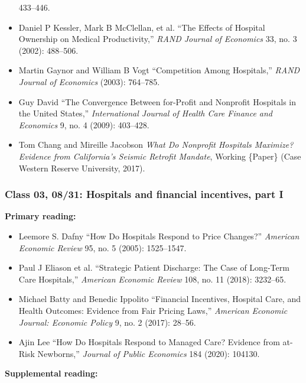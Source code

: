 \documentclass[11pt,]{article}
\providecommand{\tightlist}{%
  \setlength{\itemsep}{0pt}\setlength{\parskip}{0pt}}
\begin{document}
\begin{itemize}
  433--446.
\item
  Daniel P Kessler, Mark B McClellan, et al. {``The {Effects} of
  {Hospital} {Ownership} on {Medical} {Productivity},''} \emph{RAND
  Journal of Economics} 33, no. 3 (2002): 488--506.
\item
  Martin Gaynor and William B Vogt {``Competition Among {Hospitals},''}
  \emph{RAND Journal of Economics} (2003): 764--785.
\item
  Guy David {``The Convergence Between for-Profit and Nonprofit
  Hospitals in the {United} {States},''} \emph{International Journal of
  Health Care Finance and Economics} 9, no. 4 (2009): 403--428.
\item
  Tom Chang and Mireille Jacobson \emph{What Do {Nonprofit} {Hospitals}
  {Maximize}? {Evidence} from {California}'s {Seismic} {Retrofit}
  {Mandate}}, Working \{Paper\} (Case Western Reserve University, 2017).
\end{itemize}

\hypertarget{class-03-0831-hospitals-and-financial-incentives-part-i}{%
\subsubsection{Class 03, 08/31: Hospitals and financial incentives, part
I}\label{class-03-0831-hospitals-and-financial-incentives-part-i}}

\textbf{Primary reading:}

\begin{itemize}
\tightlist
\item
  Leemore S. Dafny {``How {Do} {Hospitals} {Respond} to {Price}
  {Changes}?''} \emph{American Economic Review} 95, no. 5 (2005):
  1525--1547.
\item
  Paul J Eliason et al. {``Strategic Patient Discharge: {The} Case of
  Long-Term Care Hospitals,''} \emph{American Economic Review} 108, no.
  11 (2018): 3232--65.
\item
  Michael Batty and Benedic Ippolito {``Financial Incentives, Hospital
  Care, and Health Outcomes: {Evidence} from Fair Pricing Laws,''}
  \emph{American Economic Journal: Economic Policy} 9, no. 2 (2017):
  28--56.
\item
  Ajin Lee {``How Do Hospitals Respond to Managed Care? {Evidence} from
  at-Risk Newborns,''} \emph{Journal of Public Economics} 184 (2020):
  104130.
\end{itemize}

\textbf{Supplemental reading:}
\end{document}
